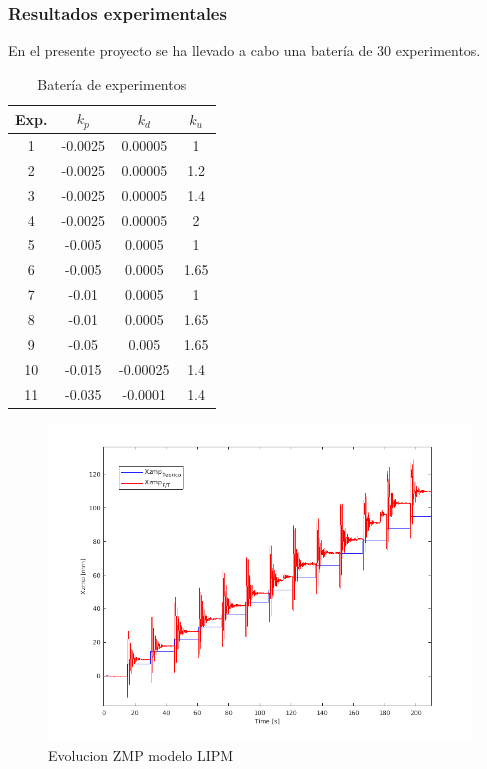\subsubsection{Resultados experimentales}

En el presente proyecto se ha llevado a cabo una batería de 30 experimentos.

\begin{table}[H]
\begin{center}
\begin{tabular}{|c|c|c|c|}
\hline
Exp. & $k_p$    & $k_d$    & $k_u$ \\ \hline
1    & -0.0025 & 0.00005  & 1    \\ \hline
2    & -0.0025 & 0.00005  & 1.2  \\ \hline
3    & -0.0025 & 0.00005  & 1.4  \\ \hline
4    & -0.0025 & 0.00005  & 2    \\ \hline
5    & -0.005  & 0.0005   & 1    \\ \hline
6    & -0.005  & 0.0005   & 1.65 \\ \hline
7    & -0.01   & 0.0005   & 1    \\ \hline
8    & -0.01   & 0.0005   & 1.65 \\ \hline
9    & -0.05   & 0.005    & 1.65 \\ \hline
10   & -0.015  & -0.00025 & 1.4  \\ \hline
11   & -0.035  & -0.0001  & 1.4  \\ \hline
\end{tabular}
\end{center}
\caption{Batería de experimentos}
\label{tabla51}
\end{table}


\begin{figure}[H]
\centering
\includegraphics[scale=0.8]{imagenes/apartado_5/5.1/53_evolucion_zmp_lipm}
\caption{Evolucion ZMP modelo LIPM}
\label{figura53}
\end{figure}




